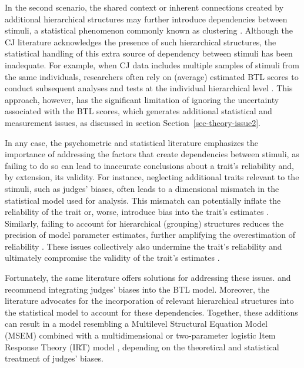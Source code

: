 \documentclass[
  authoryear,
  preprint,
  1p]{elsarticle}
\begin{document}
In the second scenario, the shared context or inherent connections
created by additional hierarchical structures may further introduce
dependencies between stimuli, a statistical phenomenon commonly known as
clustering \citep{Everitt_et_al_2010}. Although the CJ literature
acknowledges the presence of such hierarchical structures, the
statistical handling of this extra source of dependency between stimuli
has been inadequate. For example, when CJ data includes multiple samples
of stimuli from the same individuals, researchers often rely on
(average) estimated BTL scores to conduct subsequent analyses and tests
at the individual hierarchical level
\citep{Bramley_et_al_2019, Boonen_et_al_2020, Bouwer_et_al_2023, vanDaal_et_al_2017, Jones_et_al_2019, Gijsen_et_al_2021}.
This approach, however, has the significant limitation of ignoring the
uncertainty associated with the BTL scores, which generates additional
statistical and measurement issues, as discussed in section
Section~\ref{sec-theory-issue2}.

In any case, the psychometric and statistical literature emphasizes the
importance of addressing the factors that create dependencies between
stimuli, as failing to do so can lead to inaccurate conclusions about a
trait's reliability and, by extension, its validity. For instance,
neglecting additional traits relevant to the stimuli, such as judges'
biases, often leads to a dimensional mismatch in the statistical model
used for analysis. This mismatch can potentially inflate the reliability
of the trait \citep[pp.~341]{Hoyle_et_al_2023} or, worse, introduce bias
into the trait's estimates \citep{Ackerman_1989}. Similarly, failing to
account for hierarchical (grouping) structures reduces the precision of
model parameter estimates, further amplifying the overestimation of
reliability \citep[pp.~482]{Hoyle_et_al_2023}. These issues collectively
also undermine the trait's reliability and ultimately compromise the
validity of the trait's estimates \citep[pp.~2]{Perron_et_al_2015}.

Fortunately, the same literature offers solutions for addressing these
issues. \citet{Andrich_1978} and \citet{Wainer_et_al_1978} recommend
integrating judges' biases into the BTL model. Moreover, the literature
advocates for the incorporation of relevant hierarchical structures into
the statistical model to account for these dependencies. Together, these
additions can result in a model resembling a Multilevel Structural
Equation Model (MSEM) \citep[chap.~26]{Hoyle_et_al_2023} combined with a
multidimensional or two-parameter logistic Item Response Theory (IRT)
model \citep[chap.~15]{Hoyle_et_al_2023}, depending on the theoretical
and statistical treatment of judges' biases.
\end{document}
